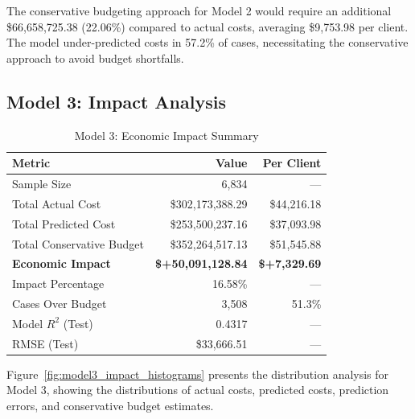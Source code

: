 The conservative budgeting approach for Model 2 would require an additional \$66,658,725.38 (22.06\%) compared to actual costs, averaging \$9,753.98 per client. The model under-predicted costs in 57.2\% of cases, necessitating the conservative approach to avoid budget shortfalls.

\clearpage

\subsection{Model 3: Impact Analysis}
\label{subsec:model3_impact}

\begin{table}[htbp]
\centering
\small
\caption{Model 3: Economic Impact Summary}
\label{tab:model3_impact_summary}
\begin{tabular}{lrr}
\toprule
\textbf{Metric} & \textbf{Value} & \textbf{Per Client} \\
\midrule
Sample Size & 6,834 & --- \\
\midrule
Total Actual Cost & \$302,173,388.29 & \$44,216.18 \\
Total Predicted Cost & \$253,500,237.16 & \$37,093.98 \\
Total Conservative Budget & \$352,264,517.13 & \$51,545.88 \\
\midrule
\textbf{Economic Impact} & \textbf{\$+50,091,128.84} & \textbf{\$+7,329.69} \\
Impact Percentage & 16.58\% & --- \\
\midrule
Cases Over Budget & 3,508 & 51.3\% \\
\midrule
Model $R^2$ (Test) & 0.4317 & --- \\
RMSE (Test) & \$33,666.51 & --- \\
\bottomrule
\end{tabular}
\end{table}

Figure~\ref{fig:model3_impact_histograms} presents the distribution analysis for Model 3, showing the distributions of actual costs, predicted costs, prediction errors, and conservative budget estimates.

